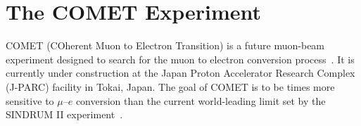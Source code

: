 \chapter{The COMET Experiment}\label{ch:comet}







COMET (COherent Muon to Electron Transition) is a future muon-beam experiment
designed to search for the muon to electron conversion
process~\cite{the_comet_collaboration_comet_2020}. It is currently under
construction at the Japan Proton Accelerator Research Complex (J-PARC) facility
in Tokai, Japan. The goal of COMET is to be  times more
sensitive to $\mu$--$e$ conversion than the current world-leading limit set by
the SINDRUM II experiment~\cite{Bertl:2006up}. 

